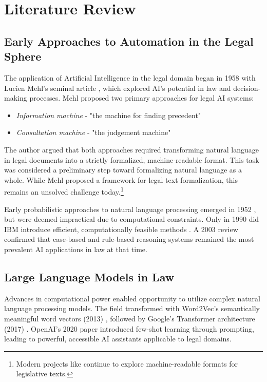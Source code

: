 \chapter{Literature Review}
\label{chap:lr}


\section{Early Approaches to Automation in the Legal Sphere}
\label{sec:early}

The application of Artificial Intelligence in the legal domain began in 1958 with Lucien Mehl's seminal article \cite{automation_in_legal_1958}, which explored AI's potential in law and decision-making processes. Mehl proposed two primary approaches for legal AI systems:
\begin{itemize}
    \item \textit{Information machine} - "the machine for finding precedent"
    \item \textit{Consultation machine} - "the judgement machine"
\end{itemize}

The author argued that both approaches required transforming natural language in legal documents into a strictly formalized, machine-readable format. This task was considered a preliminary step toward formalizing natural language as a whole. While Mehl proposed a framework for legal text formalization, this remains an unsolved challenge today.\footnote{
    Modern projects like \cite{merigouxCatalaProgrammingLanguage2021} continue to explore machine-readable formats for legislative texts.
}

Early probabilistic approaches to natural language processing emerged in 1952 \cite{weaverTranslation1952}, but were deemed impractical due to computational constraints. Only in 1990 did IBM introduce efficient, computationally feasible methods \cite{brownStatisticalApproachMachine1990}. A 2003 review \cite{risslandAILawFruitful2003} confirmed that case-based and rule-based reasoning systems remained the most prevalent AI applications in law at that time.

\section{Large Language Models in Law}
Advances in computational power enabled opportunity to utilize complex natural language processing models.
The field transformed with Word2Vec's semantically meaningful word vectors (2013) \cite{mikolovEfficientEstimationWord2013},
followed by Google's Transformer architecture (2017) \cite{vaswaniAttentionAllYou2017}. 
OpenAI's 2020 paper \cite{brownLanguageModelsAre2020} introduced few-shot learning through prompting, 
leading to powerful, accessible AI assistants applicable to legal domains.



